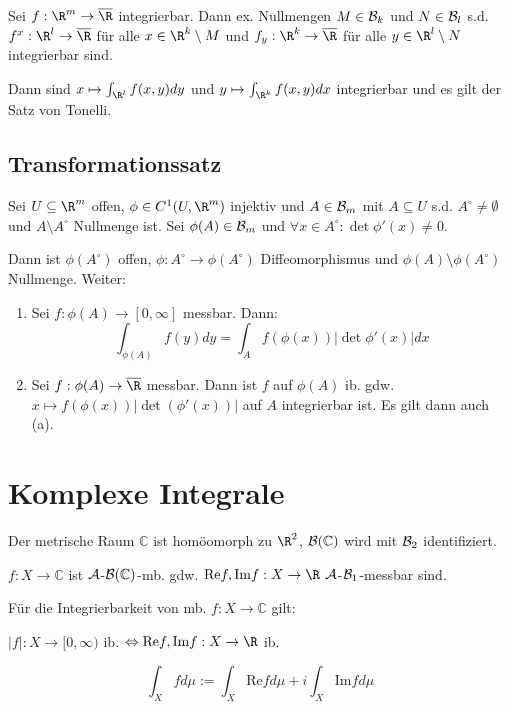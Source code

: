 Sei $f : \R^m \to \overline\R$ integrierbar. Dann ex. Nullmengen $M \in \mathcal{B}_k$ und $N \in \mathcal{B}_l$ s.d. $f^x : \R^l \to \overline\R$ für alle $x \in \R^k \setminus M$ und $f_y : \R^k \to \overline\R$ für alle $y \in \R^l \setminus N$ integrierbar sind.

Dann sind $x \mapsto \int_{\R^l} f(x,y) dy$ und $y \mapsto \int_{\R^k} f(x,y) dx$ integrierbar und es gilt der Satz von Tonelli.

\subsection*{Transformationssatz}

Sei $U \subseteq \R^m$ offen, $\phi \in C^1(U,\R^m)$ injektiv und $A \in \mathcal{B}_m$ mit $A \subseteq U$ s.d. $A^\circ \neq \emptyset$ und $A \setminus A^\circ$ Nullmenge ist. Sei $\phi(A) \in \mathcal{B}_m$ und $\forall x \in A^\circ : \det \phi'(x) \neq 0$.

Dann ist $\phi(A^\circ)$ offen, $\phi : A^\circ \to \phi(A^\circ)$ Diffeomorphismus und $\phi(A) \setminus \phi(A^\circ)$ Nullmenge. Weiter:

\begin{enumerate}[label=(\alph*)]
	\item Sei $f: \phi(A) \to [0,\infty]$ messbar. Dann: \vspace{-2mm} $$\int_{\phi(A)} f(y) dy = \int_A f(\phi(x))|\det \phi'(x)| dx$$
	\item Sei $f : \phi(A) \to \overline\R$ messbar. Dann ist $f$ auf $\phi(A)$ ib. gdw. $x \mapsto f(\phi(x))|\det(\phi'(x))|$ auf $A$ integrierbar ist. Es gilt dann auch (a).
\end{enumerate}

\section*{Komplexe Integrale}

Der metrische Raum $\mathbb{C}$ ist homöomorph zu $\R^2$, $\mathcal{B}(\mathbb{C})$ wird mit $\mathcal{B}_2$ identifiziert.

$f : X \to \mathbb{C}$ ist $\mathcal{A}$-$\mathcal{B}(\mathbb{C})$-mb. gdw. $\text{Re} f, \text{Im} f : X \to \R$ $\mathcal{A}$-$\mathcal{B}_1$-messbar sind.

Für die Integrierbarkeit von mb. $f : X \to \mathbb{C}$ gilt:

$|f| : X \to [0,\infty)$ ib. $\Leftrightarrow \text{Re} f, \text{Im} f : X \to \R$ ib.

$$\int_X f d\mu := \int_X \text{Re} f d\mu + i \int_X \text{Im} f d\mu$$

